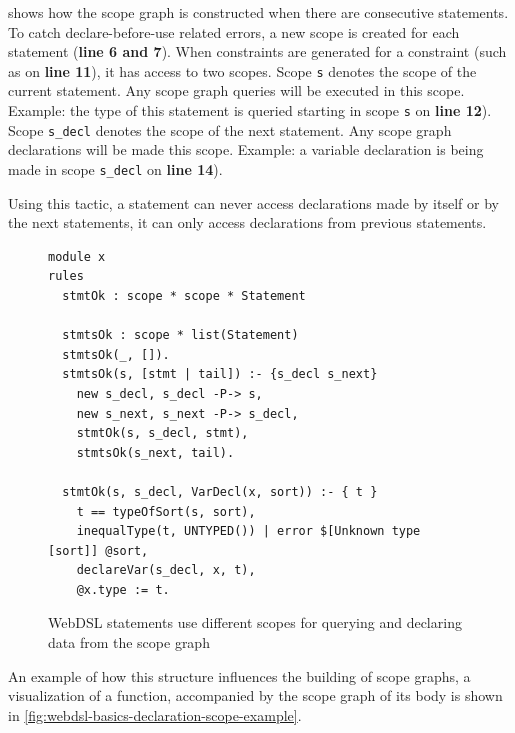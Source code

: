        shows how the scope graph is constructed when there are consecutive statements. To catch declare-before-use related errors, a new scope is created for each statement (\textbf{line 6 and 7}). When constraints are generated for a constraint (such as on \textbf{line 11}), it has access to two scopes. Scope \texttt{s} denotes the scope of the current statement. Any scope graph queries will be executed in this scope. Example: the type of this statement is queried starting in scope \texttt{s} on \textbf{line 12}). Scope \texttt{s\_decl} denotes the scope of the next statement. Any scope graph declarations will be made this scope. Example: a variable declaration is being made in scope \texttt{s\_decl} on \textbf{line 14}).

      Using this tactic, a statement can never access declarations made by itself or by the next statements, it can only access declarations from previous statements.

      \begin{figure}
        \begin{verbatim}
module x
rules
  stmtOk : scope * scope * Statement

  stmtsOk : scope * list(Statement)
  stmtsOk(_, []).
  stmtsOk(s, [stmt | tail]) :- {s_decl s_next}
    new s_decl, s_decl -P-> s,
    new s_next, s_next -P-> s_decl,
    stmtOk(s, s_decl, stmt),
    stmtsOk(s_next, tail).

  stmtOk(s, s_decl, VarDecl(x, sort)) :- { t }
    t == typeOfSort(s, sort),
    inequalType(t, UNTYPED()) | error $[Unknown type [sort]] @sort,
    declareVar(s_decl, x, t),
    @x.type := t.  
        \end{verbatim}
        \caption{\label{fig:webdsl-simple-variable-declaration-scope}WebDSL statements use different scopes for querying and declaring data from the scope graph}
      \end{figure}

      An example of how this structure influences the building of scope graphs, a visualization of a function, accompanied by the scope graph of its body is shown in \cref{fig:webdsl-basics-declaration-scope-example}.

